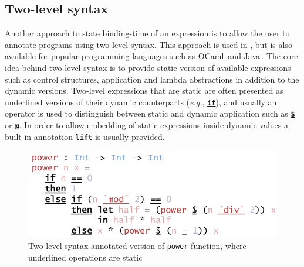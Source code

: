 \documentclass{ituthesis}
\newcommand{\ttdec}[1]{\textcolor{declared-var-color}{\texttt{#1}}}
\theoremstyle{break}
\begin{document}


\subsection{Two-level syntax}
\label{sub:Two-levelsyntax}
Another approach to state binding-time of an expression is to allow the user to annotate programs using two-level syntax.
This approach is used in \textcite{Jones:1993:PEA:153676}, but is also available for popular programming languages such as OCaml\,\autocite{taha2004gentle} and Java\,\autocite{Westbrook:2010:MJM:1809028.1806642}.
The core idea behind two-level syntax is to provide static version of available expressions such as control structures, application and lambda abstractions in addition to the dynamic versions.
Two-level expressions that are static are often presented as underlined versions of their dynamic counterparts (\textit{e.g.}, \texttt{\textbf{\underline{if}}}), and usually an operator is used to distinguish between
static and dynamic application such as \texttt{\textbf{\underline{\$}}} or \texttt{\textbf{\underline{@}}}.
In order to allow embedding of static expressions inside dynamic values a built-in annotation \texttt{\textbf{lift}} is usually provided.

\begin{figure}[ht]
\begin{center}
    \includegraphics[scale=0.5]{Figures/PowerAnnotated.png}
\end{center}
\caption{Two-level syntax annotated version of \ttdec{power} function, where underlined operations are static}
\label{fig:powan}
\end{figure}
\end{document}
